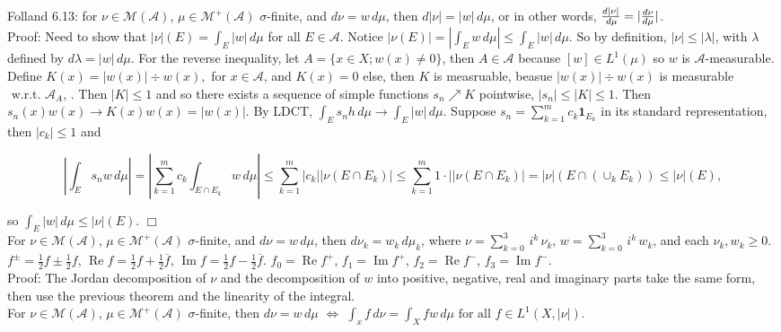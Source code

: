 \documentclass[12pt]{article}
\newcommand{\fall}[0] { \textrm{ for all } }
\newcommand{\wrt}[0] { \textrm{ w.r.t. } }
\newcommand{\A}[0] { \mathcal{A} }
\newcommand{\M}[0] { \mathcal{M} }
\renewcommand{\Re}{ \operatorname{Re} }
\renewcommand{\Im}{ \operatorname{Im} }
\newcommand{\lrimply}[0] { \Leftrightarrow }
\newcommand{\rarw}[0] { \rightarrow }
\newcommand{ \cf }[1] { \mathbf{1}_{#1} }
\begin{document}
Folland 6.13: for $\nu \in \M(\A)$, $\mu \in \M^+(\A)$ $\sigma$-finite, and $d\nu = w \, d\mu$, then $d|\nu| = |w| \, d\mu$, or in other words, $\frac{d|\nu|}{\\d\mu} = |\frac{d\nu}{d\mu}|$. \\

\noindent
Proof: Need to show that $|\nu|(E) = \int_E |w| \, d\mu$ for all $E \in \A$. Notice $|\nu(E)| = |\int_E w \, d\mu| \le \int_E |w| \, d\mu$. So by definition, $|\nu| \le |\lambda|$, with $\lambda$ defined by $d\lambda = |w| \, d\mu$. For the reverse inequality, let $A = \{x \in X; w(x) \not = 0 \}$, then $A \in \A$ because $[w] \in L^1(\mu)$ so $w$ is $\A$-measurable. Define $K(x) = |w(x)| \div w(x),$ for $x \in \A$, and $K(x) = 0$ else, then $K$ is measruable, beasue $ |w(x)| \div w(x) $ is measurable $\wrt \A_A$, . Then $|K| \le 1$ and so there exists a sequence of simple functions $s_n \nearrow K$ pointwise, $|s_n| \le |K| \le 1$. Then $s_n(x) w(x) \rarw K(x) w(x) = |w(x)|$. By LDCT, $\int_E s_n h \, d\mu \rarw \int_E |w| \, d\mu$. Suppose $s_n = \sum_{k=1}^m c_k \cf{E_k}$ in its standard representation, then $|c_k| \le 1$ and 

$$
|\int_E s_n w \, d\mu | = |\sum_{k=1}^m c_k \int_{E \cap E_k} w \, d\mu| \le \sum_{k=1}^m |c_k| |\nu(E \cap E_k)|  \le \sum_{k=1}^m 1 \cdot| |\nu(E \cap E_k)| = |\nu|(E \cap (\cup_k E_k)) \le |\nu|(E),
$$

\noindent
so $\int_E |w| \, d\mu \le |\nu|(E)$. $\Box$\\

For $\nu \in \M(\A)$, $\mu \in \M^+(\A)$ $\sigma$-finite, and $d\nu = w \, d\mu$, then $d\nu_k = w_k \, d\mu_k$, where $\nu = \sum_{k=0}^3 \, i^k \, \nu_k$, $w = \sum_{k=0}^3 \, i^k \, w_k$, and each $\nu_k , w_k \ge 0$. \\

\noindent
$f^\pm = \frac{1}{2} f \pm  \frac{1}{2} f$, $\Re{f} = \frac{1}{2} f + \frac{1}{2} \overline{f}$, $\Im{f} = \frac{1}{2} f - \frac{1}{2} \overline{f}$. $f_0 = \Re{f}^+$, $f_1 = \Im{f}^+$, $f_2 = \Re{f}^-$, $f_3 = \Im{f}^-$. \\

\noindent
Proof: The Jordan decomposition of $\nu$ and the decomposition of $w$ into positive, negative, real and imaginary parts take the same form, then use the  previous theorem and the linearity of the integral. \\

For $\nu \in \M(\A)$, $\mu \in \M^+(\A)$ $\sigma$-finite, then $d\nu = w \, d\mu$ $\lrimply$ $\int_x f \, d\nu = \int_X fw \, d\mu \fall f \in L^1(X, |\nu|)$.\\
\end{document}
